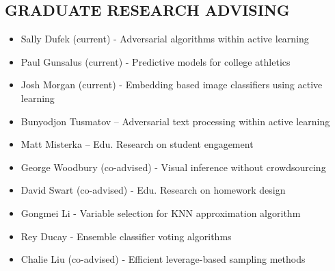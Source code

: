 \documentclass[margin, 10pt]{res}\usepackage[]{graphicx}\usepackage[]{color}
\begin{document}
\begin{resume}
  
\section{GRADUATE RESEARCH ADVISING}
\begin{itemize} \itemsep -2pt %
	\item Sally Dufek (current) - Adversarial algorithms within active learning
  \item	Paul Gunsalus (current) - Predictive models for college athletics
  \item Josh Morgan (current) - Embedding based image classifiers using active learning
	\item Bunyodjon Tusmatov – Adversarial text processing within active learning 
  \item	Matt Misterka – Edu. Research on student engagement
  \item	George Woodbury (co-advised) - Visual inference without crowdsourcing
  \item	David Swart (co-advised) - Edu. Research on homework design
  \item	Gongmei Li - Variable selection for KNN approximation algorithm
  \item	Rey Ducay - Ensemble classifier voting algorithms
  \item	Chalie Liu (co-advised) - Efficient leverage-based sampling methods
\end{itemize}


\end{resume}
\end{document}
